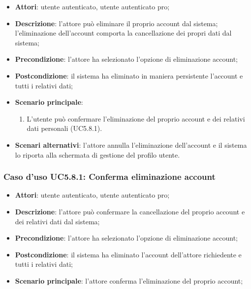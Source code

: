 \begin{itemize}
	\item \textbf{Attori}: utente autenticato, utente autenticato pro;
	\item \textbf{Descrizione}: l'attore può eliminare il proprio account dal sistema; l'eliminazione dell'account comporta la cancellazione dei propri dati dal sistema; 
	\item \textbf{Precondizione}: l'attore ha selezionato l'opzione di eliminazione account;
	\item \textbf{Postcondizione}: il sistema ha eliminato in maniera persistente l'account e tutti i relativi dati;
	\item \textbf{Scenario principale}:
		\begin{enumerate}
			\item L'utente può confermare l'eliminazione del proprio account e dei relativi dati personali (UC5.8.1).
		\end{enumerate}
		\item \textbf{Scenari alternativi}: l'attore annulla l'eliminazione dell'account e il sistema lo riporta alla schermata di gestione del profilo utente.
\end{itemize}

\subsubsection{Caso d'uso UC5.8.1: Conferma eliminazione account}

\begin{itemize}
	\item \textbf{Attori}: utente autenticato, utente autenticato pro;
	\item \textbf{Descrizione}: l'attore può confermare la cancellazione del proprio account e dei relativi dati dal sistema;
	\item \textbf{Precondizione}: l'attore ha selezionato l'opzione di eliminazione account;
	\item \textbf{Postcondizione}: il sistema ha eliminato l'account dell'attore richiedente e tutti i relativi dati;
	\item \textbf{Scenario principale}: l'attore conferma l'eliminazione del proprio account;
\end{itemize}